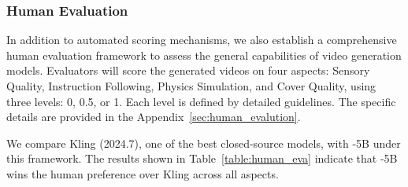 





\subsubsection{Human Evaluation}

In addition to automated scoring mechanisms, we also establish a comprehensive human evaluation framework to assess the general capabilities of video generation models. Evaluators will score the generated videos on four aspects: Sensory Quality, Instruction Following, Physics Simulation, and Cover Quality, using three levels: 0, 0.5, or 1. Each level is defined by detailed guidelines. The specific details are provided in the Appendix~\ref{sec:human_evalution}.

We compare Kling (2024.7), one of the best closed-source models, with \model-5B under this framework. The results shown in Table~\ref{table:human_eva} indicate that \model-5B wins the human preference over Kling across all aspects. 







